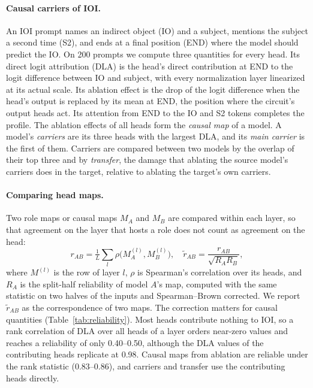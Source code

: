 \documentclass[11pt]{article}
\begin{document}
\paragraph{Causal carriers of IOI.}
An IOI prompt names an indirect object (IO) and a subject, mentions the subject a second time (S2), and ends at a final position (END) where the model should predict the IO.
On 200 prompts \citep{wang2023interpretability} we compute three quantities for every head. Its direct logit attribution (DLA) is the head's direct contribution at END to the logit difference between IO and subject, with every normalization layer linearized at its actual scale. Its ablation effect is the drop of the logit difference when the head's output is replaced by its mean at END, the position where the circuit's output heads act. Its attention from END to the IO and S2 tokens completes the profile.
The ablation effects of all heads form the \emph{causal map} of a model.
A model's \emph{carriers} are its three heads with the largest DLA, and its \emph{main carrier} is the first of them.
Carriers are compared between two models by the overlap of their top three and by \emph{transfer}, the damage that ablating the source model's carriers does in the target, relative to ablating the target's own carriers.

\paragraph{Comparing head maps.}
Two role maps or causal maps $M_A$ and $M_B$ are compared within each layer, so that agreement on the layer that hosts a role does not count as agreement on the head:
\begin{equation*}
r_{AB} = \tfrac{1}{L}\textstyle\sum_{l} \rho\big(M_A^{(l)}, M_B^{(l)}\big),\quad
\tilde r_{AB} = \frac{r_{AB}}{\sqrt{R_A R_B}},
\end{equation*}
where $M^{(l)}$ is the row of layer $l$, $\rho$ is Spearman's correlation over its heads, and $R_A$ is the split-half reliability of model $A$'s map, computed with the same statistic on two halves of the inputs and Spearman--Brown corrected.
We report $\tilde r_{AB}$ as the correspondence of two maps.
The correction matters for causal quantities (Table~\ref{tab:reliability}).
Most heads contribute nothing to IOI, so a rank correlation of DLA over all heads of a layer orders near-zero values and reaches a reliability of only 0.40--0.50, although the DLA values of the contributing heads replicate at 0.98.
Causal maps from ablation are reliable under the rank statistic (0.83--0.86), and carriers and transfer use the contributing heads directly.
\end{document}
